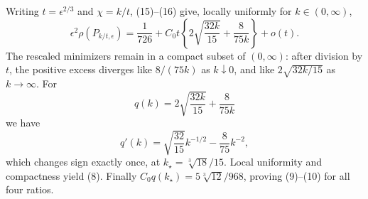 Writing \(t=\epsilon^{2/3}\) and \(\chi=k/t\), (15)--(16) give, locally uniformly for \(k\in(0,\infty)\),
\[
 \epsilon^2\rho(P_{k/t,\epsilon})
 =\frac1{726}+C_0t\left\{2\sqrt{\frac{32k}{15}}+\frac8{75k}\right\}+o(t).     \tag{17}
\]
The rescaled minimizers remain in a compact subset of \((0,\infty)\): after division by \(t\), the positive excess diverges like \(8/(75k)\) as \(k\downarrow0\), and like \(2\sqrt{32k/15}\) as \(k\to\infty\).  For
\[
 q(k)=2\sqrt{\frac{32k}{15}}+\frac8{75k}
\]
we have
\[
 q'(k)=\sqrt{\frac{32}{15}}k^{-1/2}-\frac8{75}k^{-2},
\]
which changes sign exactly once, at \(k_\star=\sqrt[3]{18}/15\).  Local uniformity and compactness yield (8).  Finally \(C_0q(k_\star)=5\sqrt[3]{12}/968\), proving (9)--(10) for all four ratios.